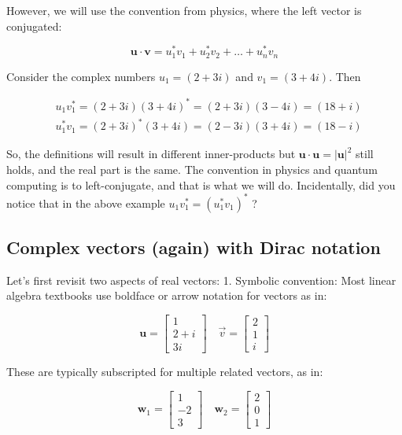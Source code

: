 \documentclass[main.tex]{subfiles}
\begin{document}
    However, we will use the convention from physics, where the left vector is conjugated:
    
    $$
    \mathbf{u} \cdot \mathbf{v}=u_{1}^{*} v_{1}+u_{2}^{*} v_{2}+\ldots+u_{n}^{*} v_{n}
    $$
    
    Consider the complex numbers $u_{1}=(2+3 i)$ and $v_{1}=(3+4 i)$. Then
    
    $$
    \begin{aligned}
    &u_{1} v_{1}^{*}=(2+3 i)(3+4 i)^{*}=(2+3 i)(3-4 i)=(18+i) \\
    &u_{1}^{*} v_{1}=(2+3 i)^{*}(3+4 i)=(2-3 i)(3+4 i)=(18-i)
    \end{aligned}
    $$
    
    So, the definitions will result in different inner-products but $\mathbf{u} \cdot \mathbf{u}=|\mathbf{u}|^{2}$ still holds, and the real part is the same. The convention in physics and quantum computing is to left-conjugate, and that is what we will do. Incidentally, did you notice that in the above example $u_{1} v_{1}^{*}=\left(u_{1}^{*} v_{1}\right)^{*}$ ?

\subsection{Complex vectors (again) with Dirac notation}

    Let's first revisit two aspects of real vectors: 1. Symbolic convention: Most linear algebra textbooks use boldface or arrow notation for vectors as in:
    
    $$
    \mathbf{u}=\left[\begin{array}{r}
    1 \\
    2+i \\
    3 i
    \end{array}\right] \quad \vec{v}=\left[\begin{array}{l}
    2 \\
    1 \\
    i
    \end{array}\right]
    $$
    
    These are typically subscripted for multiple related vectors, as in:
    
    $$
    \mathbf{w}_{1}=\left[\begin{array}{r}
    1 \\
    -2 \\
    3
    \end{array}\right] \quad \mathbf{w}_{2}=\left[\begin{array}{l}
    2 \\
    0 \\
    1
    \end{array}\right]
    $$
    
\end{document}
